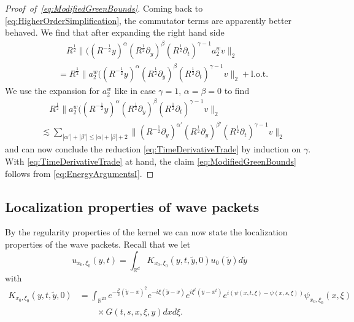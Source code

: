 \documentclass{amsart}
\theoremstyle{definition}
\newcommand{\R}{\mathbb{R}}
\begin{document}
\begin{proof}[Proof~of~\eqref{eq:ModifiedGreenBounds}]
Coming back to \eqref{eq:HigherOrderSimplification}, the commutator terms are apparently better behaved. We find that after expanding the right hand side
\begin{equation*}
\begin{split}
&\quad R^{\frac{1}{2}} \| ((R^{-\frac{1}{2}} y)^{\alpha} (R^{\frac{1}{2}} \partial_y)^{\beta} (R^{\frac{1}{2}} \partial_t)^{\gamma-1} a_2^w v \|_2 \\
&= R^{\frac{1}{2}} \| a_2^w ((R^{-\frac{1}{2}} y)^{\alpha} (R^{\frac{1}{2}} \partial_y)^{\beta} (R^{\frac{1}{2}} \partial_t)^{\gamma-1}  v \|_2 + \text{l.o.t.}
\end{split}
\end{equation*}
We use the expansion for $a_2^w$ like in case $\gamma = 1$, $\alpha = \beta = 0$ to find
\begin{equation*}
\begin{split}
&\quad R^{\frac{1}{2}} \| a_2^w ((R^{-\frac{1}{2}} y)^{\alpha} (R^{\frac{1}{2}} \partial_y)^{\beta} (R^{\frac{1}{2}} \partial_t)^{\gamma-1}  v \|_2 \\
 &\lesssim \sum_{|\alpha'| + |\beta'| \leq |\alpha| + |\beta| + 2} \| (R^{-\frac{1}{2}} \partial_y)^{\alpha'} (R^{\frac{1}{2}} \partial_y)^{\beta'} (R^{\frac{1}{2}} \partial_t)^{\gamma-1} v \|_2
 \end{split}
\end{equation*}
and can now conclude the reduction \eqref{eq:TimeDerivativeTrade} by induction on $\gamma$. With \eqref{eq:TimeDerivativeTrade} at hand, the claim \eqref{eq:ModifiedGreenBounds} follows from \eqref{eq:EnergyArgumentsI}.
\end{proof}

\subsection{Localization properties of wave packets}
\label{section:Localization}
By the regularity properties of the kernel we can now state the localization properties of the wave packets.
Recall that we let
\begin{equation*}
u_{x_0,\xi_0}(y,t) = \int_{\R^d} K_{x_0,\xi_0}(y,t,\tilde{y},0) u_0(\tilde{y}) d\tilde{y}
\end{equation*}
with
\begin{equation*}
\begin{split}
K_{x_0,\xi_0}(y,t,\tilde{y},0) &= \int_{\R^{2d}} e^{- \frac{\rho}{2}(\tilde{y}-x)^2} e^{-i \xi (\tilde{y}-x)} e^{i \xi^t (y-x^t)} e^{i (\psi(x,t,\xi) - \psi(x,s,\xi))} \psi_{x_0,\xi_0}(x,\xi) \\
&\quad \quad \times G(t,s,x,\xi,y) dx d\xi.
\end{split}
\end{equation*}
\end{document}
